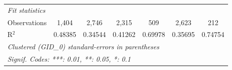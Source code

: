 \begin{tabular}{lcccccc}
   \midrule
   \emph{Fit statistics}\\
   Observations                       & 1,404    & 2,746          & 2,315         & 509          & 2,623          & 212\\  
   R$^2$                              & 0.48385  & 0.34544        & 0.41262       & 0.69978      & 0.35695        & 0.74754\\  
   \midrule \midrule
   \multicolumn{7}{l}{\emph{Clustered (GID\_0) standard-errors in parentheses}}\\
   \multicolumn{7}{l}{\emph{Signif. Codes: ***: 0.01, **: 0.05, *: 0.1}}\\
\end{tabular}
\par\endgroup



\begingroup
\centering
